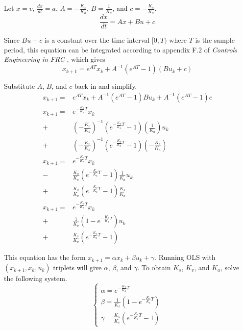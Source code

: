 \documentclass[10pt,conference,compsoc]{IEEEtran}
\begin{document}
Let $x = v$, $\frac{dx}{dt} = a$, $A = -\frac{K_v}{K_a}$, $B = \frac{1}{K_a}$,
and $c = -\frac{K_s}{K_a}$.
\begin{equation*}
  \frac{dx}{dt} = Ax + Bu + c
\end{equation*}

Since $Bu + c$ is a constant over the time interval $[0, T)$ where $T$ is the
sample period, this equation can be integrated according to appendix F.2 of
\textit{Controls Engineering in FRC} \cite{bib:controls-in-frc}, which gives
\begin{equation*}
  x_{k+1} = e^{AT} x_k + A^{-1} (e^{AT} - 1) (Bu_k + c)
\end{equation*}

Substitute $A$, $B$, and $c$ back in and simplify.
\begin{equation*}
  \begin{aligned}
    x_{k+1} =& e^{AT} x_k + A^{-1} (e^{AT} - 1)Bu_k + A^{-1} (e^{AT} - 1)c \\
    x_{k+1} =& e^{-\frac{K_v}{K_a} T} x_k \\
      +& \left(-\frac{K_v}{K_a}\right)^{-1}
        \left(e^{-\frac{K_v}{K_a} T} - 1\right)
        \left(\frac{1}{K_a}\right) u_k \\
      +& \left(-\frac{K_v}{K_a}\right)^{-1}
        \left(e^{-\frac{K_v}{K_a} T} - 1\right)
        \left(-\frac{K_s}{K_a}\right) \\
    x_{k+1} =& e^{-\frac{K_v}{K_a} T} x_k \\
      -& \frac{K_a}{K_v}
        \left(e^{-\frac{K_v}{K_a} T} - 1\right)
        \frac{1}{K_a} u_k \\
      +& \frac{K_a}{K_v}
        \left(e^{-\frac{K_v}{K_a} T} - 1\right)
        \frac{K_s}{K_a} \\
    x_{k+1} =& e^{-\frac{K_v}{K_a} T} x_k \\
      +& \frac{1}{K_v}
        \left(1 - e^{-\frac{K_v}{K_a} T}\right) u_k \\
      +& \frac{K_s}{K_v}
        \left(e^{-\frac{K_v}{K_a} T} - 1\right)
  \end{aligned}
\end{equation*}

This equation has the form $x_{k+1} = \alpha x_k + \beta u_k + \gamma$. Running
OLS with $(x_{k+1}, x_k, u_k)$ triplets will give $\alpha$, $\beta$, and
$\gamma$. To obtain $K_s$, $K_v$, and $K_a$, solve the following system.
\begin{equation*}
  \begin{cases}
    \alpha = e^{-\frac{K_v}{K_a} T} \\
    \beta = \frac{1}{K_v}\left(1 - e^{-\frac{K_v}{K_a} T}\right) \\
    \gamma = \frac{K_s}{K_v}\left(e^{-\frac{K_v}{K_a} T} - 1\right)
  \end{cases}
\end{equation*}
\end{document}
